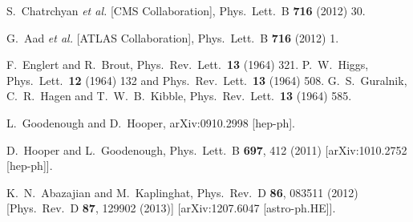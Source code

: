 \documentclass[preprintnumbers,superscriptaddress,nofootinbib,aps,prd,floatfix]{revtex4}
\begin{document}
\begin{thebibliography}{99}


  S.~Chatrchyan {\it et al.}  [CMS Collaboration],
  Phys.\ Lett.\ B {\bf 716} (2012) 30.

  G.~Aad {\it et al.}  [ATLAS Collaboration],
  Phys.\ Lett.\ B {\bf 716} (2012) 1.

  F.~Englert and R.~Brout,
  Phys.\ Rev.\ Lett.\  {\bf 13} (1964) 321.
  P.~W.~Higgs,
  Phys.\ Lett.\  {\bf 12} (1964) 132 and
  Phys.\ Rev.\ Lett.\  {\bf 13} (1964) 508.
  G.~S.~Guralnik, C.~R.~Hagen and T.~W.~B.~Kibble,
  Phys.\ Rev.\ Lett.\  {\bf 13} (1964) 585.



  L.~Goodenough and D.~Hooper,
  arXiv:0910.2998 [hep-ph].

  D.~Hooper and L.~Goodenough,
  Phys.\ Lett.\ B {\bf 697}, 412 (2011)
  [arXiv:1010.2752 [hep-ph]].

  K.~N.~Abazajian and M.~Kaplinghat,
  Phys.\ Rev.\ D {\bf 86}, 083511 (2012)
  [Phys.\ Rev.\ D {\bf 87}, 129902 (2013)]
  [arXiv:1207.6047 [astro-ph.HE]].
  

\end{thebibliography}
\end{document}
